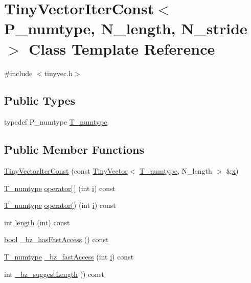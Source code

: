 \hypertarget{classTinyVectorIterConst}{}\section{Tiny\+Vector\+Iter\+Const$<$ P\+\_\+numtype, N\+\_\+length, N\+\_\+stride $>$ Class Template Reference}
\label{classTinyVectorIterConst}


{\ttfamily \#include $<$tinyvec.\+h$>$}

\subsection*{Public Types}
\begin{DoxyCompactItemize}
\item 
typedef P\+\_\+numtype \hyperlink{classTinyVectorIterConst_af6c906e88c1735d57e65accb54aba68f}{T\+\_\+numtype}
\end{DoxyCompactItemize}
\subsection*{Public Member Functions}
\begin{DoxyCompactItemize}
\item 
\hyperlink{classTinyVectorIterConst_a5eaa24b1d5797df71208420acb86fb51}{Tiny\+Vector\+Iter\+Const} (const \hyperlink{classTinyVector}{Tiny\+Vector}$<$ \hyperlink{classTinyVectorIterConst_af6c906e88c1735d57e65accb54aba68f}{T\+\_\+numtype}, N\+\_\+length $>$ \&\hyperlink{vecnorm1_8cc_ac73eed9e41ec09d58f112f06c2d6cb63}{x})
\item 
\hyperlink{classTinyVectorIterConst_af6c906e88c1735d57e65accb54aba68f}{T\+\_\+numtype} \hyperlink{classTinyVectorIterConst_aadd834f05142ed9ef7c77254bc48fb33}{operator\mbox{[}$\,$\mbox{]}} (int \hyperlink{indexexpr_8h_aabd77643995707c185e95c8cb2782c81}{i}) const 
\item 
\hyperlink{classTinyVectorIterConst_af6c906e88c1735d57e65accb54aba68f}{T\+\_\+numtype} \hyperlink{classTinyVectorIterConst_a698b6ff2291c7e8d6e6b25f2f60789ce}{operator()} (int \hyperlink{indexexpr_8h_aabd77643995707c185e95c8cb2782c81}{i}) const 
\item 
int \hyperlink{classTinyVectorIterConst_a5eae9b7c537d5c9d572bb41de280c134}{length} (int) const 
\item 
\hyperlink{compiler_8h_abb452686968e48b67397da5f97445f5b}{bool} \hyperlink{classTinyVectorIterConst_aeb26b3a598792679a7781f70e9c10383}{\+\_\+bz\+\_\+has\+Fast\+Access} () const 
\item 
\hyperlink{classTinyVectorIterConst_af6c906e88c1735d57e65accb54aba68f}{T\+\_\+numtype} \hyperlink{classTinyVectorIterConst_a55acfe5a6f080a899ca202afcbf9ce17}{\+\_\+bz\+\_\+fast\+Access} (int \hyperlink{indexexpr_8h_aabd77643995707c185e95c8cb2782c81}{i}) const 
\item 
int \hyperlink{classTinyVectorIterConst_a88642c744ca2cdc3f9c399ba956a9add}{\+\_\+bz\+\_\+suggest\+Length} () const 
\end{DoxyCompactItemize}
